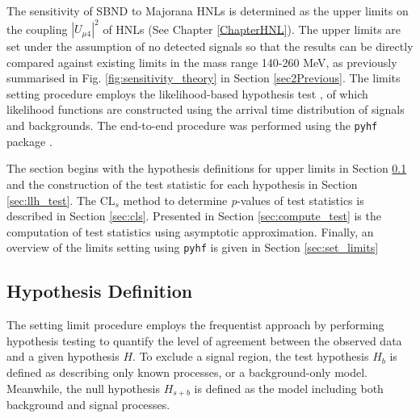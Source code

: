 The sensitivity of SBND to Majorana HNLs is determined as the upper limits on the coupling $|U_{\mu4}|^2$ of HNLs (See Chapter \ref{ChapterHNL}).
The upper limits are set under the assumption of no detected signals so that the results can be directly compared against existing limits in the mass range 140-260 MeV, as previously summarised in Fig. \ref{fig:sensitivity_theory} in Section \ref{sec2Previous}. 
The limits setting procedure employs the likelihood-based hypothesis test \cite{asymptotic_test}, of which likelihood functions are constructed using the arrival time distribution of signals and backgrounds.
The end-to-end procedure was performed using the \texttt{pyhf} package \cite{pyhf_joss}.

The section begins with the hypothesis definitions for upper limits in Section \ref{sec:hypothesis_def} and the construction of the test statistic for each hypothesis in Section \ref{sec:llh_test}.
The CL$_{s}$ method to determine \textit{p}-values of test statistics is described in Section \ref{sec:cls}.
Presented in Section \ref{sec:compute_test} is the computation of test statistics using asymptotic approximation.
Finally, an overview of the limits setting using \texttt{pyhf} is given in Section \ref{sec:set_limits} 




\subsection{Hypothesis Definition}
\label{sec:hypothesis_def}
The setting limit procedure employs the frequentist approach by performing hypothesis testing to quantify the level of agreement between the observed data and a given hypothesis $H$.
To exclude a signal region, the test hypothesis $H_{b}$ is defined as describing only known processes, or a background-only model.
Meanwhile, the null hypothesis $H_{s+b}$ is defined as the model including both background and signal processes.

